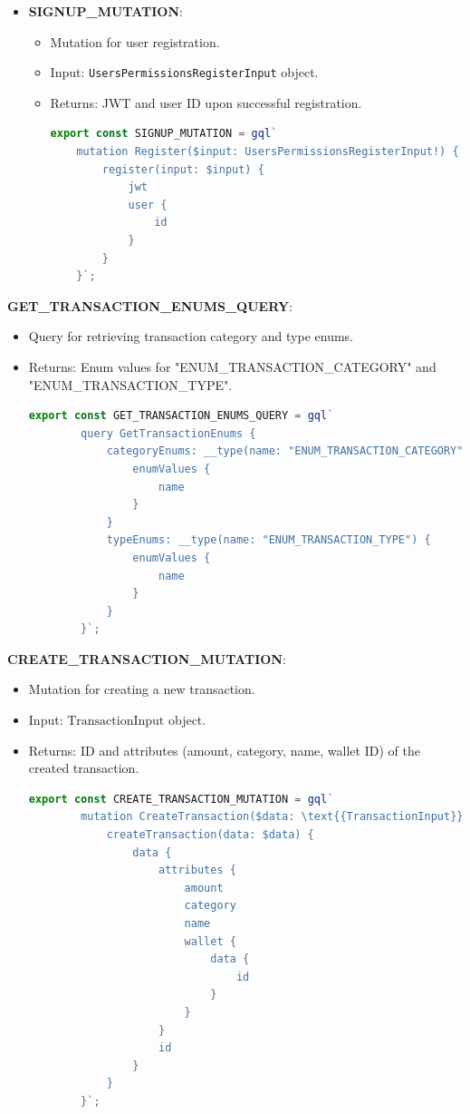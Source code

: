 \begin{itemize}
    \item \textbf{SIGNUP\_MUTATION}:
    \begin{itemize}
        \item Mutation for user registration.
        \item Input: \texttt{UsersPermissionsRegisterInput} object.
        \item Returns: JWT and user ID upon successful registration.
        \begin{lstlisting}[language=TypeScript]
export const SIGNUP_MUTATION = gql`
    mutation Register($input: UsersPermissionsRegisterInput!) {
        register(input: $input) {
            jwt
            user {
                id
            }
        }
    }`;
\end{lstlisting}
    \end{itemize}


\end{itemize}

\item \textbf{GET\_TRANSACTION\_ENUMS\_QUERY}:
\begin{itemize}
    \item Query for retrieving transaction category and type enums.
    \item Returns: Enum values for "ENUM\_TRANSACTION\_CATEGORY" and "ENUM\_TRANSACTION\_TYPE".
    \begin{lstlisting}[language=TypeScript]
    export const GET_TRANSACTION_ENUMS_QUERY = gql`
        query GetTransactionEnums {
            categoryEnums: __type(name: "ENUM_TRANSACTION_CATEGORY") {
                enumValues {
                    name
                }
            }
            typeEnums: __type(name: "ENUM_TRANSACTION_TYPE") {
                enumValues {
                    name
                }
            }
        }`;
    \end{lstlisting}
\end{itemize}

\item \textbf{CREATE\_TRANSACTION\_MUTATION}:
\begin{itemize}
    \item Mutation for creating a new transaction.
    \item Input: \(\text{{TransactionInput}}\) object.
    \item Returns: ID and attributes (amount, category, name, wallet ID) of the created transaction.
    \begin{lstlisting}[language=TypeScript]
    export const CREATE_TRANSACTION_MUTATION = gql`
        mutation CreateTransaction($data: \text{{TransactionInput}}!) {
            createTransaction(data: $data) {
                data {
                    attributes {
                        amount
                        category
                        name
                        wallet {
                            data {
                                id
                            }
                        }
                    }
                    id
                }
            }
        }`;
    \end{lstlisting}
\end{itemize}

